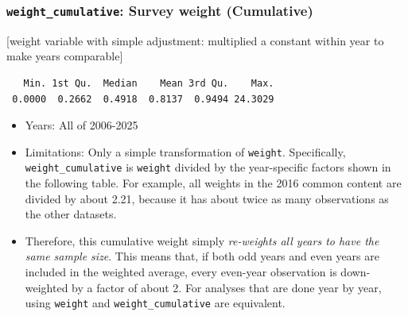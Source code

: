 \documentclass[10pt,article,oneside]{memoir}
\begin{document}
\subsubsection{\texorpdfstring{\texttt{weight\_cumulative}: Survey
weight
(Cumulative)}{weight\_cumulative: Survey weight (Cumulative)}}\label{weight_cumulative-survey-weight-cumulative}

{[}weight variable with simple adjustment: multiplied a constant within
year to make years comparable{]}

\begin{verbatim}
   Min. 1st Qu.  Median    Mean 3rd Qu.    Max. 
 0.0000  0.2662  0.4918  0.8137  0.9494 24.3029 
\end{verbatim}

\begin{itemize}
\tightlist
\item
  Years: All of 2006-2025
\item
  Limitations: Only a simple transformation of \texttt{weight}.
  Specifically, \texttt{weight\_cumulative} is \texttt{weight} divided
  by the year-specific factors shown in the following table. For
  example, all weights in the 2016 common content are divided by about
  2.21, because it has about twice as many observations as the other
  datasets.
\item
  Therefore, this cumulative weight simply \emph{re-weights all years to
  have the same sample size}. This means that, if both odd years and
  even years are included in the weighted average, every even-year
  observation is down-weighted by a factor of about 2. For analyses that
  are done year by year, using \texttt{weight} and
  \texttt{weight\_cumulative} are equivalent.
\end{itemize}
\end{document}
